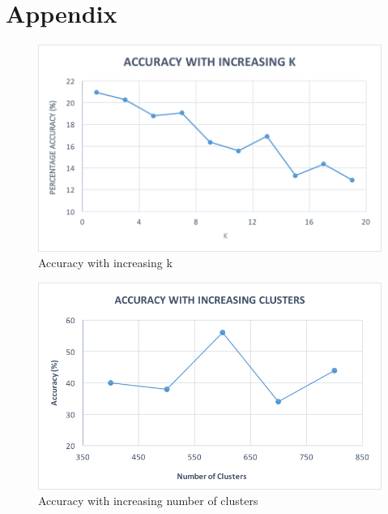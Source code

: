 \documentclass[a4paper]{article}
\begin{document}
\newpage
\appendix

\section*{Appendix}

\bigskip
\bigskip

\begin{figure}[h!]
  \centering
  \includegraphics[width=1\textwidth]{kNN}
  \caption{Accuracy with increasing k}
\end{figure}

\bigskip \bigskip \bigskip \bigskip

\begin{figure}[h!]
  \centering
  \includegraphics[width=1\textwidth]{clusters}
  \caption{Accuracy with increasing number of clusters}
\end{figure}
\end{document}
